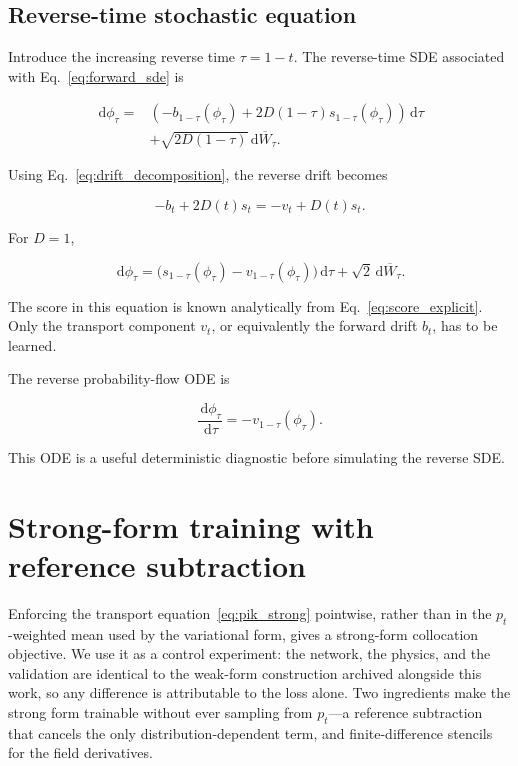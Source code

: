 \documentclass[reprint,twocolumn,superscriptaddress,preprintnumbers,amsmath,amssymb,aps,prd,floatfix]{revtex4-2}
\newcommand{\dd}{\,\mathrm{d}}
\begin{document}
\subsection{Reverse-time stochastic equation}

Introduce the increasing reverse time $\tau=1-t$. The reverse-time SDE associated with Eq.~\eqref{eq:forward_sde} is

\begin{align}
 \dd\phi_\tau
 ={}&
 \left(
 -b_{1-\tau}(\phi_\tau)
 +
 2D(1-\tau)s_{1-\tau}(\phi_\tau)
 \right)\dd\tau
 \nonumber\\
 &+
 \sqrt{2D(1-\tau)}\dd\overline W_\tau.
 \label{eq:reverse_sde_general}
\end{align}

Using Eq.~\eqref{eq:drift_decomposition}, the reverse drift becomes

\begin{equation}
 -b_t+2D(t)s_t
 =
 -v_t+D(t)s_t.
 \label{eq:reverse_drift_decomposition}
\end{equation}

For $D=1$,

\begin{equation}
 \dd\phi_\tau
 =
 \bigl(s_{1-\tau}(\phi_\tau)-v_{1-\tau}(\phi_\tau)\bigr)\dd\tau
 +
 \sqrt{2}\dd\overline W_\tau.
 \label{eq:reverse_sde_unit_diffusion}
\end{equation}

The score in this equation is known analytically from Eq.~\eqref{eq:score_explicit}. Only the transport component $v_t$, or equivalently the forward drift $b_t$, has to be learned.

The reverse probability-flow ODE is

\begin{equation}
 \frac{\dd\phi_\tau}{\dd\tau}
 =
 -v_{1-\tau}(\phi_\tau).
 \label{eq:reverse_probability_flow}
\end{equation}

This ODE is a useful deterministic diagnostic before simulating the reverse SDE.


\section{Strong-form training with reference subtraction}
\label{sec:strong}

Enforcing the transport equation~\eqref{eq:pik_strong} pointwise, rather than in
the $p_t$-weighted mean used by the variational form, gives a strong-form
collocation objective. We use it as a control experiment: the network, the physics,
and the validation are identical to the weak-form construction archived alongside
this work, so any difference is attributable to the loss alone. Two ingredients make
the strong form trainable without ever sampling from $p_t$---a reference subtraction
that cancels the only distribution-dependent term, and finite-difference stencils
for the field derivatives.
\end{document}
